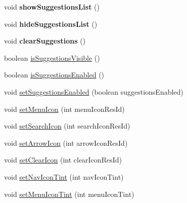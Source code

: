 \begin{DoxyCompactItemize}
\mbox{\label{classcom_1_1example_1_1searchwidget_1_1_search_bar_a050d0db47fa9e7291ab21504221568a1}} 
void {\bfseries show\+Suggestions\+List} ()
\item 
\mbox{\label{classcom_1_1example_1_1searchwidget_1_1_search_bar_a01ec47e108f94db7991ea3e7e3e0ab4d}} 
void {\bfseries hide\+Suggestions\+List} ()
\item 
\mbox{\label{classcom_1_1example_1_1searchwidget_1_1_search_bar_a0df6d7493a354659852a45778500c96e}} 
void {\bfseries clear\+Suggestions} ()
\item 
boolean \mbox{\hyperlink{classcom_1_1example_1_1searchwidget_1_1_search_bar_aab6325bdf7997340d11ba29cbca66a34}{is\+Suggestions\+Visible}} ()
\item 
boolean \mbox{\hyperlink{classcom_1_1example_1_1searchwidget_1_1_search_bar_afc87e89a8864899a626d2dcafb5db5b2}{is\+Suggestions\+Enabled}} ()
\item 
void \mbox{\hyperlink{classcom_1_1example_1_1searchwidget_1_1_search_bar_af24e5b6d3487e7ac76d615e5260a0054}{set\+Suggestions\+Enabled}} (boolean suggestions\+Enabled)
\item 
void \mbox{\hyperlink{classcom_1_1example_1_1searchwidget_1_1_search_bar_a06e0a90b2e6483038bb3d28a92a1a05c}{set\+Menu\+Icon}} (int menu\+Icon\+Res\+Id)
\item 
void \mbox{\hyperlink{classcom_1_1example_1_1searchwidget_1_1_search_bar_a3f9335e4481de2b5db38735df6b19753}{set\+Search\+Icon}} (int search\+Icon\+Res\+Id)
\item 
void \mbox{\hyperlink{classcom_1_1example_1_1searchwidget_1_1_search_bar_a38c90dccdf3d37fb78613230997e91a8}{set\+Arrow\+Icon}} (int arrow\+Icon\+Res\+Id)
\item 
void \mbox{\hyperlink{classcom_1_1example_1_1searchwidget_1_1_search_bar_a26dd3ac06416bc0d666d2ce792656c05}{set\+Clear\+Icon}} (int clear\+Icon\+Res\+Id)
\item 
void \mbox{\hyperlink{classcom_1_1example_1_1searchwidget_1_1_search_bar_a9bfe579751743d32b1008418c6787142}{set\+Nav\+Icon\+Tint}} (int nav\+Icon\+Tint)
\item 
void \mbox{\hyperlink{classcom_1_1example_1_1searchwidget_1_1_search_bar_a14d304a30b0065246ea3319c730f2e5c}{set\+Menu\+Icon\+Tint}} (int menu\+Icon\+Tint)

\end{DoxyCompactItemize}
